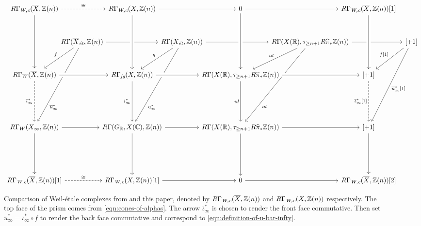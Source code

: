 \documentclass{article}
\numberwithin{equation}{section}
\begin{document}
\begin{landscape}
  \begin{figure}
    \[ \begin{tikzcd}[column sep=0.5em, row sep=3em]
        R\Gamma_\Wc (\overline{X}, \ZZ(n)) \ar{dd}\ar[dashed]{rr}{\cong} &[-1.5em] &[-1.5em] R\Gamma_\Wc (X, \ZZ(n))\ar{rr} &[-1.5em] &[-1.5em] 0 \ar{rr} &[-2.5em] &[-2.5em] R\Gamma_\Wc (\overline{X}, \ZZ(n)) [1] \\
        & R\Gamma (\overline{X}_\et, \ZZ(n)) \ar{rr}\ar[near end]{dddl}{\overline{u}_\infty^*}\ar{dl}[swap]{f} & & R\Gamma (X_\et, \ZZ(n)) \ar[near end]{dddl}{u_\infty^*}\ar{dl}[swap]{g}\ar{rr} && R\Gamma (X (\RR), \tau_{\ge n+1} R\widehat{\pi}_* \ZZ (n))\ar{dl}[swap]{id}\ar[near end]{dddl}{id}\ar{rr} && {[+1]}\ar{dddl}{\overline{u}_\infty^* [1]} \ar{dl}[swap]{f[1]} \\
        R\Gamma_W (\overline{X}, \ZZ(n)) \ar[dashed]{dd}[swap]{\overline{\iota}_\infty^*}\ar[crossing over]{rr} & & R\Gamma_\fg (X, \ZZ(n)) \ar{dd}[swap]{i_\infty^*}\ar[crossing over]{rr}\ar[<-,crossing over]{uu} && R\Gamma (X (\RR), \tau_{\ge n+1} R\widehat{\pi}_* \ZZ (n)) \ar{dd}[swap]{id}\ar[<-,crossing over]{uu} \ar[crossing over]{rr} && {[+1]}\ar[<-,crossing over]{uu}\ar[dashed]{dd}[swap]{\overline{\iota}_\infty^* [1]} \\
        \\
        R\Gamma_W (X_\infty, \ZZ (n)) \ar{rr}\ar{dd} & & R\Gamma (G_\RR, X (\CC), \ZZ (n)) \ar{rr}\ar{dd} && R\Gamma (X (\RR), \tau_{\ge n+1} R\widehat{\pi}_* \ZZ (n)) \ar{rr}\ar{dd} && {[+1]}\ar{dd} \\
        \\
        R\Gamma_\Wc (\overline{X}, \ZZ(n))[1] \ar[dashed]{rr}{\cong} && R\Gamma_\Wc (X, \ZZ(n))[1]\ar{rr} && 0 \ar{rr} && R\Gamma_\Wc (\overline{X}, \ZZ(n)) [2]      
      \end{tikzcd} \]

    \caption{Comparison of Weil-étale complexes from \cite{Flach-Morin-2018} and
      this paper, denoted by $R\Gamma_{\text{\it W,c}} (\overline{X}, \mathbb{Z}(n))$ and
      $R\Gamma_{\text{\it W,c}} (X, \mathbb{Z}(n))$ respectively. The top face of the prism comes
      from \eqref{eqn:cones-of-alphas}. The arrow $\overline{\iota}_\infty^*$ is
      chosen to render the front face commutative. Then set
      $\overline{u}_\infty^* = \overline{\iota}_\infty^* \circ f$ to render the
      back face commutative and correspond to
      \eqref{eqn:definition-of-u-bar-infty}.}
    \label{fig:comparison-with-FM}
  \end{figure}
\end{landscape}
\end{document}
